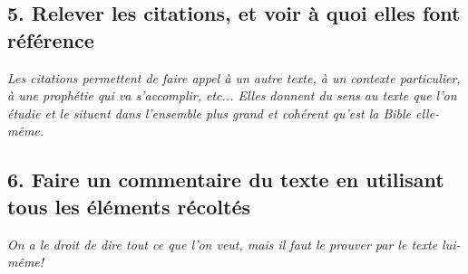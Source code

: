 \subsection*{5. Relever les citations, et voir à quoi elles font référence}
\textit{Les citations permettent de faire appel à un autre texte, à un contexte particulier, à une prophétie qui va s'accomplir, etc... Elles donnent du sens au texte que l'on étudie et le situent dans l'ensemble plus grand et cohérent qu'est la Bible elle-même.}
\subsection*{6. Faire un commentaire du texte en utilisant tous les éléments récoltés}
\textit{On a le droit de dire tout ce que l'on veut, mais il faut le prouver par le texte lui-même!}